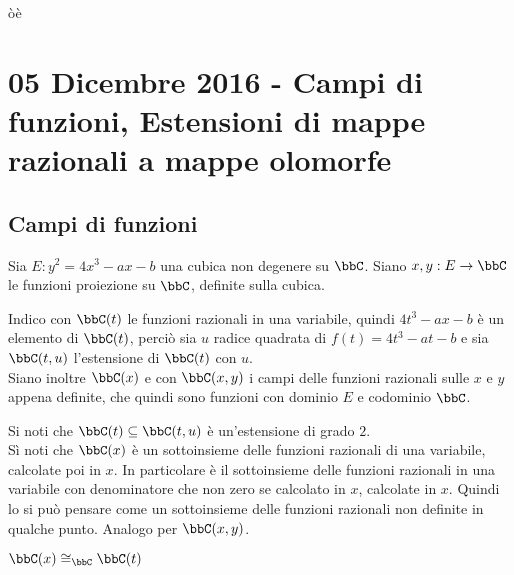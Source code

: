 òè%

\chapter{05 Dicembre 2016 - Campi di funzioni, Estensioni di mappe razionali a mappe olomorfe}
\justify

\section{Campi di funzioni}

Sia $E: y^2=4x^3-ax-b$ una cubica non degenere su $\bbC$.
Siano $x,y:E\rightarrow\bbC$ le funzioni proiezione su $\bbC$, definite sulla cubica.
\begin{definizione}
Indico con $\bbC(t)$ le funzioni razionali in una variabile, quindi $4t^3-ax-b$ è un elemento di $\bbC(t)$, perciò sia $u$ radice quadrata di $f(t)=4t^3-at-b$ e sia $\bbC(t,u)$ l'estensione di $\bbC(t)$ con $u$.\\
Siano inoltre $\bbC(x)$ e con $\bbC(x,y)$ i campi delle funzioni razionali sulle $x$ e $y$ appena definite, che quindi sono funzioni con dominio $E$ e codominio $\bbC$.
\end{definizione}

\begin{osservazione}
Si noti che $\bbC(t)\subseteq\bbC(t,u)$ è un'estensione di grado $2$.\\
Sì noti che $\bbC(x)$ è un sottoinsieme delle funzioni razionali di una variabile, calcolate poi in $x$. In particolare è il sottoinsieme delle funzioni razionali in una variabile con denominatore che non zero se calcolato in $x$, calcolate in $x$. Quindi lo si può pensare come un sottoinsieme delle funzioni razionali non definite in qualche punto.
Analogo per $\bbC(x,y)$.
\end{osservazione}

\begin{proposizione}
$\bbC(x)\cong_{\bbC}\bbC(t)$
\end{proposizione}

